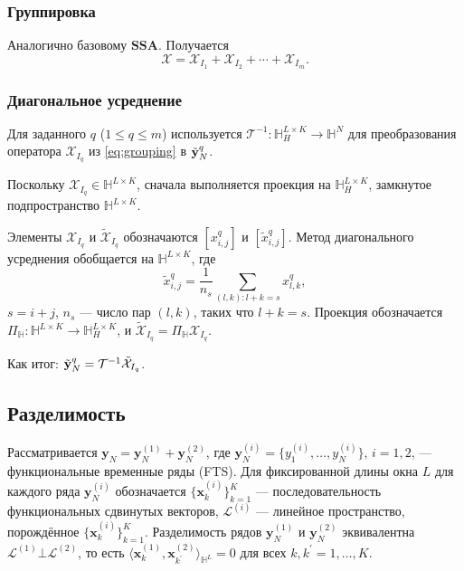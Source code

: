 \documentclass[a4paper, 11pt]{article}
\newcommand{\SSA}{\textbf{SSA}}
\begin{document}
\subsubsection{Группировка}

Аналогично базовому $\SSA$. Получается 
\begin{equation}\label{eq:grouping}
	\mathcal{X}=\mathcal{X}_{I_1}+\mathcal{X}_{I_2}+\cdots+\mathcal{X}_{I_m}.
\end{equation}


\subsubsection{Диагональное усреднение}

Для заданного $q$ ($1\leq q\leq m$) используется $\mathcal{T}^{-1}:\mathbb{H}_H^{L\times K}\to\mathbb{H}^N$ для преобразования оператора $\mathcal{X}_{I_q}$ из \eqref{eq:grouping} в $\tilde{\bf y}_N^q$. 

Поскольку $\mathcal{X}_{I_q}\in\mathbb{H}^{L\times K}$, сначала выполняется проекция на $\mathbb{H}_H^{L\times K}$, замкнутое подпространство $\mathbb{H}^{L\times K}$. 

Элементы $\mathcal{X}_{I_q}$ и $\tilde{\mathcal{X}}_{I_q}$ обозначаются $[x_{i,j}^{q}]$ и $[\tilde{x}_{i,j}^{q}]$. Метод диагонального усреднения  обобщается на $\mathbb{H}^{L\times K}$, где
\begin{equation}\label{fdiag-ave}
\tilde{x}_{i,j}^{q}=\frac{1}{n_s}\sum_{(l,k): l+k=s} x_{l,k}^q,
\end{equation}
$s=i+j$, $n_s$ — число пар $(l,k)$, таких что $l+k=s$. Проекция обозначается $\Pi_\mathbb{H}:\mathbb{H}^{L\times K}\to\mathbb{H}_H^{L\times K}$, и $\tilde{\mathcal{X}}_{I_q}=\Pi_\mathbb{H} \mathcal{X}_{I_q}$. 

Как итог: $\tilde{\bf y}_N^q=\mathcal{T}^{-1}\tilde{\mathcal{X}}_{I_q}$.




\subsection{Разделимость}\label{subsec: Separability}

Рассматривается $\textbf{y}_N=\textbf{y}_N^{(1)}+\textbf{y}_N^{(2)}$, где $\textbf{y}_N^{(i)}=\{y_1^{(i)},\ldots,y_N^{(i)}\}$, $i=1,2$, — функциональные временные ряды (FTS). Для фиксированной длины окна $L$ для каждого ряда $\textbf{y}_N^{(i)}$ обозначается $\{{\pmb x}_{k}^{(i)}\}_{k=1}^K$ — последовательность функциональных сдвинутых векторов, $\mathcal{L}^{(i)}$ — линейное пространство, порождённое $\{{\pmb x}_{k}^{(i)}\}_{k=1}^K$. Разделимость рядов $\textbf{y}_N^{(1)}$ и $\textbf{y}_N^{(2)}$ эквивалентна $\mathcal{L}^{(1)}\bot\mathcal{L}^{(2)}$, то есть $\langle {\pmb x}_{k}^{(1)},{\pmb x}_{k^\prime}^{(2)}\rangle_{\mathbb{H}^L}=0$ для всех $k,k^\prime=1,\ldots,K$. 
\end{document}
